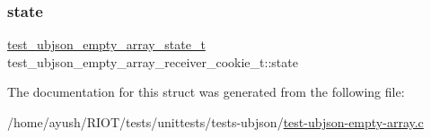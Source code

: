 \subsubsection{\texorpdfstring{state}{state}}
{\footnotesize\ttfamily \hyperlink{test-ubjson-empty-array_8c_a21d764b9e7f88c76539b4608ec752aa3}{test\+\_\+ubjson\+\_\+empty\+\_\+array\+\_\+state\+\_\+t} test\+\_\+ubjson\+\_\+empty\+\_\+array\+\_\+receiver\+\_\+cookie\+\_\+t\+::state}



The documentation for this struct was generated from the following file\+:\begin{DoxyCompactItemize}
\item 
/home/ayush/\+R\+I\+O\+T/tests/unittests/tests-\/ubjson/\hyperlink{test-ubjson-empty-array_8c}{test-\/ubjson-\/empty-\/array.\+c}\end{DoxyCompactItemize}
